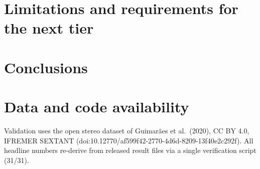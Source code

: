 \documentclass[review]{elsarticle}
\begin{document}
\section{Limitations and requirements for the next tier}\label{sec:lim}

\section{Conclusions}\label{sec:concl}

\section*{Data and code availability}
Validation uses the open stereo dataset of Guimar\~aes et al.\ (2020),
CC BY 4.0, IFREMER SEXTANT
(doi:10.12770/af599f42-2770-4d6d-8209-13f40e2c292f). All headline
numbers re-derive from released result files via a single verification
script (31/31).

% 
% 
\end{document}
